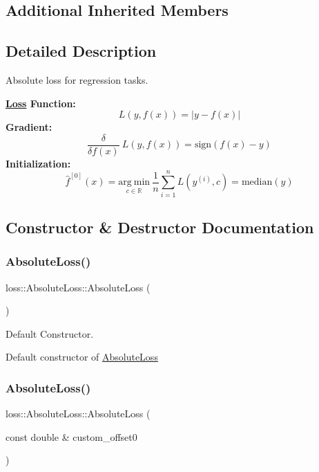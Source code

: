 \subsection*{Additional Inherited Members}


\subsection{Detailed Description}
Absolute loss for regression tasks. 

{\bfseries \hyperlink{classloss_1_1_loss}{Loss} Function\+:} \[ L(y, f(x)) = \left| y - f(x) \right| \] {\bfseries Gradient\+:} \[ \frac{\delta}{\delta f(x)}\ L(y, f(x)) = \mathrm{sign}\left( f(x) - y \right) \] {\bfseries Initialization\+:} \[ \hat{f}^{[0]}(x) = \underset{c\in\mathbb{R}}{\mathrm{arg~min}}\ \frac{1}{n}\sum\limits_{i=1}^n L\left(y^{(i)}, c\right) = \mathrm{median}(y) \] 

\subsection{Constructor \& Destructor Documentation}
\mbox{\label{classloss_1_1_absolute_loss_a4b1416147d0573079f9d652097c1ab81}} 
\subsubsection{\texorpdfstring{Absolute\+Loss()}{AbsoluteLoss()}\hspace{0.1cm}{\footnotesize\ttfamily [1/2]}}
{\footnotesize\ttfamily loss\+::\+Absolute\+Loss\+::\+Absolute\+Loss (\begin{DoxyParamCaption}{ }\end{DoxyParamCaption})}



Default Constructor. 

Default constructor of {\ttfamily \hyperlink{classloss_1_1_absolute_loss}{Absolute\+Loss}} \mbox{\label{classloss_1_1_absolute_loss_a3e056fbde0b63527bb9aadb0a4a8547a}} 
\subsubsection{\texorpdfstring{Absolute\+Loss()}{AbsoluteLoss()}\hspace{0.1cm}{\footnotesize\ttfamily [2/2]}}
{\footnotesize\ttfamily loss\+::\+Absolute\+Loss\+::\+Absolute\+Loss (\begin{DoxyParamCaption}\item[{const double \&}]{custom\+\_\+offset0 }\end{DoxyParamCaption})}



